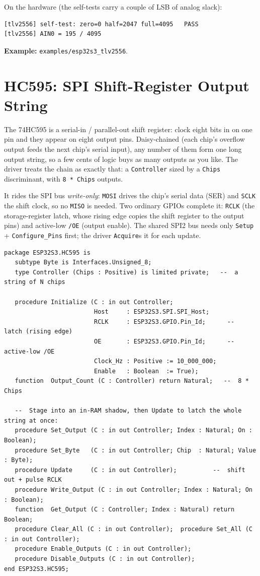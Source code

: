 On the hardware (the self-tests carry a couple of LSB of analog slack):

\begin{lstlisting}[style=sh]
[tlv2556] self-test: zero=0 half=2047 full=4095   PASS
[tlv2556] AIN0 = 195 / 4095
\end{lstlisting}

\noindent\textbf{Example:} \texttt{examples/esp32s3\_tlv2556}.

\section{HC595: SPI Shift-Register Output String}
\label{app:ext:hc595}

The 74HC595 is a serial-in / parallel-out shift register: clock eight bits in on
one pin and they appear on eight output pins. Daisy-chained (each chip's overflow
output feeds the next chip's serial input), any number of them form one long
output string, so a few cents of logic buys as many outputs as you like. The
driver treats the chain as exactly that: a \texttt{Controller} sized by a
\texttt{Chips} discriminant, with \texttt{8 * Chips} outputs.

It rides the SPI bus \emph{write-only}: \texttt{MOSI} drives the chip's serial
data (SER) and \texttt{SCLK} the shift clock, so no \texttt{MISO} is needed. Two
ordinary GPIOs complete it: \texttt{RCLK} (the storage-register latch, whose
rising edge copies the shift register to the output pins) and active-low
\texttt{/OE} (output enable). The shared SPI2 bus needs only \texttt{Setup} +
\texttt{Configure\_Pins} first; the driver \texttt{Acquire}s it for each update.

\begin{lstlisting}
package ESP32S3.HC595 is
   subtype Byte is Interfaces.Unsigned_8;
   type Controller (Chips : Positive) is limited private;   --  a string of N chips

   procedure Initialize (C : in out Controller;
                         Host     : ESP32S3.SPI.SPI_Host;
                         RCLK     : ESP32S3.GPIO.Pin_Id;      --  latch (rising edge)
                         OE       : ESP32S3.GPIO.Pin_Id;      --  active-low /OE
                         Clock_Hz : Positive := 10_000_000;
                         Enable   : Boolean  := True);
   function  Output_Count (C : Controller) return Natural;   --  8 * Chips

   --  Stage into an in-RAM shadow, then Update to latch the whole string at once:
   procedure Set_Output (C : in out Controller; Index : Natural; On : Boolean);
   procedure Set_Byte   (C : in out Controller; Chip  : Natural; Value : Byte);
   procedure Update     (C : in out Controller);          --  shift out + pulse RCLK
   procedure Write_Output (C : in out Controller; Index : Natural; On : Boolean);
   function  Get_Output (C : Controller; Index : Natural) return Boolean;
   procedure Clear_All (C : in out Controller);  procedure Set_All (C : in out Controller);
   procedure Enable_Outputs (C : in out Controller);
   procedure Disable_Outputs (C : in out Controller);
end ESP32S3.HC595;
\end{lstlisting}

